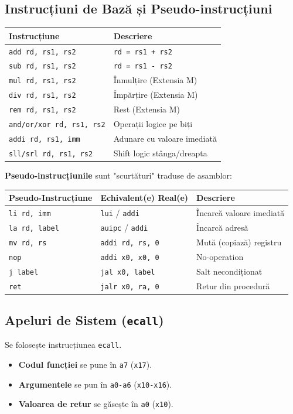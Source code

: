 \documentclass[12pt,a4paper]{article}
\begin{document}
\subsection{Instrucțiuni de Bază și Pseudo-instrucțiuni}
\begin{table}[ht!]
\centering
\begin{tabular}{ll}
\toprule
\textbf{Instrucțiune} & \textbf{Descriere} \\
\midrule
\texttt{add rd, rs1, rs2} & \texttt{rd = rs1 + rs2} \\
\texttt{sub rd, rs1, rs2} & \texttt{rd = rs1 - rs2} \\
\texttt{mul rd, rs1, rs2} & Înmulțire (Extensia M) \\
\texttt{div rd, rs1, rs2} & Împărțire (Extensia M) \\
\texttt{rem rd, rs1, rs2} & Rest (Extensia M) \\
\texttt{and/or/xor rd, rs1, rs2} & Operații logice pe biți \\
\texttt{addi rd, rs1, imm} & Adunare cu valoare imediată \\
\texttt{sll/srl rd, rs1, rs2} & Shift logic stânga/dreapta \\
\bottomrule
\end{tabular}
\end{table}

\textbf{Pseudo-instrucțiunile} sunt "scurtături" traduse de asamblor:
\begin{table}[ht!]
\centering
\begin{tabular}{lll}
\toprule
\textbf{Pseudo-Instrucțiune} & \textbf{Echivalent(e) Real(e)} & \textbf{Descriere} \\
\midrule
\texttt{li rd, imm} & \texttt{lui} / \texttt{addi} & Încarcă valoare imediată \\
\texttt{la rd, label} & \texttt{auipc} / \texttt{addi} & Încarcă adresă \\
\texttt{mv rd, rs} & \texttt{addi rd, rs, 0} & Mută (copiază) registru \\
\texttt{nop} & \texttt{addi x0, x0, 0} & No-operation \\
\texttt{j label} & \texttt{jal x0, label} & Salt necondiționat \\
\texttt{ret} & \texttt{jalr x0, ra, 0} & Retur din procedură \\
\bottomrule
\end{tabular}
\end{table}

\subsection{Apeluri de Sistem (\texttt{ecall})}
Se folosește instrucțiunea \texttt{ecall}.
\begin{itemize}
    \item \textbf{Codul funcției} se pune în \texttt{a7} (\texttt{x17}).
    \item \textbf{Argumentele} se pun în \texttt{a0-a6} (\texttt{x10-x16}).
    \item \textbf{Valoarea de retur} se găsește în \texttt{a0} (\texttt{x10}).
\end{itemize}
\end{document}

